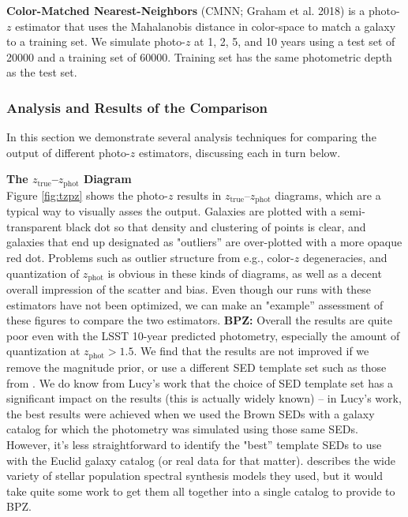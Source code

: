 \documentclass[DM,lsstdraft,toc]{lsstdoc}
\begin{document}
\textbf{Color-Matched Nearest-Neighbors} (CMNN; Graham et al. 2018) is a photo-$z$ estimator that uses the Mahalanobis distance in color-space to match a galaxy to a training set. We simulate photo-$z$ at 1, 2, 5, and 10 years using a test set of 20000 and a training set of 60000. Training set has the same photometric depth as the test set.


\subsubsection{Analysis and Results of the Comparison}\label{sssec:sel_ex_comp}

In this section we demonstrate several analysis techniques for comparing the output of different photo-$z$ estimators, discussing each in turn below.

\smallskip \noindent \textbf{The $z_\mathrm{true}$--$z_\mathrm{phot}$ Diagram} \\
Figure \ref{fig:tzpz} shows the photo-$z$ results in $z_\mathrm{true}$--$z_\mathrm{phot}$ diagrams, which are a typical way to visually asses the output. Galaxies are plotted with a semi-transparent black dot so that density and clustering of points is clear, and galaxies that end up designated as "outliers'' are over-plotted with a more opaque red dot. Problems such as outlier structure from e.g., color-$z$ degeneracies, and quantization of $z_\mathrm{phot}$ is obvious in these kinds of diagrams, as well as a decent overall impression of the scatter and bias. Even though our runs with these estimators have not been optimized, we can make an "example'' assessment of these figures to compare the two estimators.
\textbf{BPZ:} Overall the results are quite poor even with the LSST 10-year predicted photometry, especially the amount of quantization at $z_\mathrm{phot}>1.5$. We find that the results are not improved if we remove the magnitude prior, or use a different SED template set such as those from \cite{2014ApJS..212...18B}. We do know from Lucy's work that the choice of SED template set has a significant impact on the results (this is actually widely known) -- in Lucy's work, the best results were achieved when we used the Brown SEDs with a galaxy catalog for which the photometry was simulated using those same SEDs. However, it's less straightforward to identify the "best'' template SEDs to use with the Euclid galaxy catalog (or real data for that matter). \cite{2014MNRAS.439..264G} describes the wide variety of stellar population spectral synthesis models they used, but it would take quite some work to get them all together into a single catalog to provide to BPZ.
\end{document}
